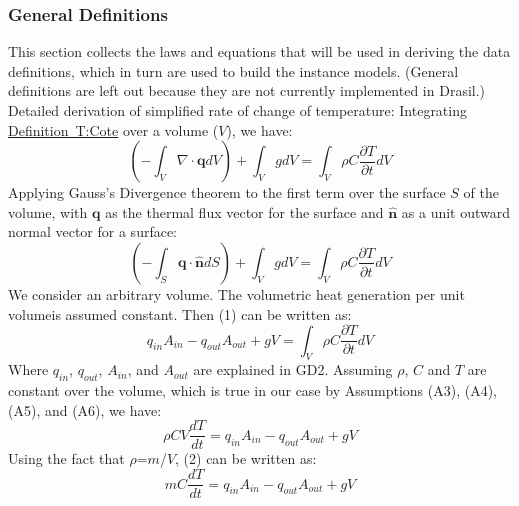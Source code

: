 \documentclass[12pt]{article}
\begin{document}
\subsubsection{General Definitions}
\label{Sec:GDs}
This section collects the laws and equations that will be used in deriving the data definitions, which in turn are used to build the instance models. (General definitions are left out because they are not currently implemented in Drasil.)
Detailed derivation of simplified rate of change of temperature:
Integrating \hyperref[T:Cote]{Definition~T:Cote} over a volume ($V$), we have:
\begin{equation}
(-\int_{V}{\nabla{}\cdot{}\mathbf{q}dV})+\int_{V}{gdV}=\int_{V}{\rho{}C\frac{\partial{}T}{\partial{}t}dV}
\end{equation}
Applying Gauss's Divergence theorem to the first term over the surface $S$ of the volume, with $\mathbf{q}$ as the thermal flux vector for the surface and $\mathbf{\hat{n}}$ as a unit outward normal vector for a surface:
\begin{equation}
(-\int_{S}{\mathbf{q}\cdot{}\mathbf{\hat{n}}dS})+\int_{V}{gdV}=\int_{V}{\rho{}C\frac{\partial{}T}{\partial{}t}dV}
\end{equation}
We consider an arbitrary volume. The volumetric heat generation per unit volumeis assumed constant. Then (1) can be written as:
\begin{equation}
q_{in}A_{in}-q_{out}A_{out}+gV=\int_{V}{\rho{}C\frac{\partial{}T}{\partial{}t}dV}
\end{equation}
Where $q_{in}$, $q_{out}$, $A_{in}$, and $A_{out}$ are explained in GD2. Assuming $\rho{}$, $C$ and $T$ are constant over the volume, which is true in our case by Assumptions (A3), (A4), (A5), and (A6), we have:
\begin{equation}
\rho{}CV\frac{dT}{dt}=q_{in}A_{in}-q_{out}A_{out}+gV
\end{equation}
Using the fact that $\rho{}$=$m$/$V$, (2) can be written as:
\begin{equation}
mC\frac{dT}{dt}=q_{in}A_{in}-q_{out}A_{out}+gV
\end{equation}
\end{document}
